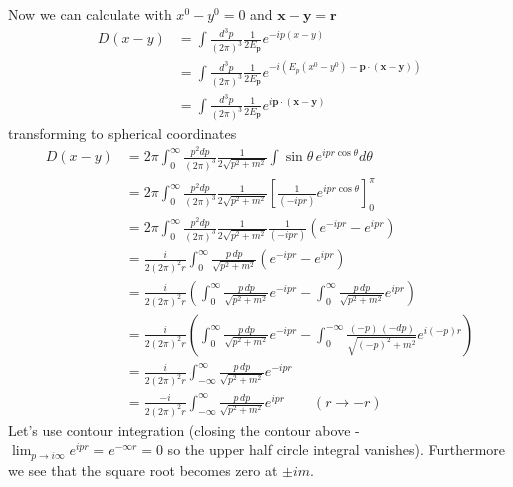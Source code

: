 \documentclass[../main.tex]{subfiles}
\begin{document}
Now we can calculate with $x^0-y^0=0$ and $\mathbf{x}-\mathbf{y}=\mathbf{r}$
\begin{align}
D(x-y)
&=\int\frac{d^3p}{(2\pi)^3}\frac{1}{2E_\mathbf{p}}e^{-ip(x-y)}\\
&=\int\frac{d^3p}{(2\pi)^3}\frac{1}{2E_\mathbf{p}}e^{-i(E_p(x^0-y^0)-\mathbf{p}\cdot(\mathbf{x}-\mathbf{y}))}\\
&=\int\frac{d^3p}{(2\pi)^3}\frac{1}{2E_\mathbf{p}}e^{i\mathbf{p}\cdot(\mathbf{x}-\mathbf{y})}
\end{align}
transforming to spherical coordinates
\begin{align}
D(x-y)
&=2\pi\int_0^\infty\frac{p^2dp}{(2\pi)^3}\frac{1}{2\sqrt{p^2+m^2}}\int\sin\theta \,e^{ipr\cos\theta}d\theta\\
&=2\pi\int_0^\infty\frac{p^2dp}{(2\pi)^3}\frac{1}{2\sqrt{p^2+m^2}}\left[\frac{1}{(-ipr)}e^{ipr\cos\theta}\right]_0^\pi\\
&=2\pi\int_0^\infty\frac{p^2dp}{(2\pi)^3}\frac{1}{2\sqrt{p^2+m^2}}\frac{1}{(-ipr)}(e^{-ipr}-e^{ipr})\\
&=\frac{i}{2(2\pi)^2r}\int_0^\infty\frac{p\,dp}{\sqrt{p^2+m^2}}(e^{-ipr}-e^{ipr})\\
&=\frac{i}{2(2\pi)^2r}\left(\int_0^\infty\frac{p\,dp}{\sqrt{p^2+m^2}}e^{-ipr}-\int_0^\infty\frac{p\,dp}{\sqrt{p^2+m^2}}e^{ipr}\right)\\
&=\frac{i}{2(2\pi)^2r}\left(\int_0^\infty\frac{p\,dp}{\sqrt{p^2+m^2}}e^{-ipr}-\int_0^{-\infty}\frac{(-p)\,(-dp)}{\sqrt{(-p)^2+m^2}}e^{i(-p)r}\right)\\
&=\frac{i}{2(2\pi)^2r}\int_{-\infty}^\infty\frac{p\,dp}{\sqrt{p^2+m^2}}e^{-ipr}\\
&=\frac{-i}{2(2\pi)^2r}\int_{-\infty}^\infty\frac{p\,dp}{\sqrt{p^2+m^2}}e^{ipr}\qquad (r\rightarrow-r)
\end{align}
Let's use contour integration (closing the contour above - $\lim_{p\rightarrow i\infty}e^{ipr}=e^{-\infty r}=0$ so the upper half circle integral vanishes). Furthermore we see that the square root becomes zero at $\pm im$. 
\end{document}

